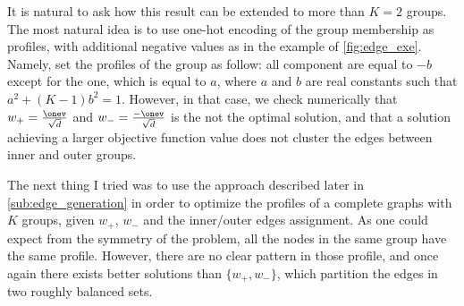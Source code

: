 \begin{aside}
  It is natural to ask how this result can be extended to more than $K=2$ groups. The most natural
  idea is to use one-hot encoding of the group membership as profiles, with additional negative
  values as in the example of \autoref{fig:edge_exe}. Namely, set the profiles of the \ith{} group
  as follow: all component are equal to $-b$ except for the \ith{} one, which is equal to $a$, where
  $a$ and $b$ are real constants such that $a^2 + (K-1)b^2=1$. However, in that case, we check
  numerically that $w_+ = \frac{\onev}{\sqrt{d}}$ and $w_- = \frac{-\onev}{\sqrt{d}}$ is the not the
  optimal solution, and that a solution achieving a larger objective function value does not cluster
  the edges between inner and outer groups.

  The next thing I tried was to use the approach described later in \autoref{sub:edge_generation} in
  order to optimize the profiles of a complete graphs with $K$ groups, given $w_+$, $w_-$ and the
  inner/outer edges assignment. As one could expect from the symmetry of the problem, all the nodes
  in the same group have the same profile. However, there are no clear pattern in those profile, and
  once again there exists better solutions than $\{w_+, w_-\}$, which partition the edges in two
  roughly balanced sets.
\end{aside}
